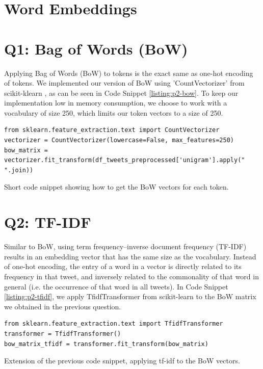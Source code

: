 \section*{\large Word Embeddings}


\section*{Q1: Bag of Words (BoW)}
Applying Bag of Words (BoW) \cite{bow} to tokens is the exact same as one-hot encoding of tokens.  We implemented our version of BoW using 'CountVectorizer' from scikit-klearn \cite{sklearn1, sklearn2}, as can be seen in Code Snippet \ref{listing:p2-bow}. To keep our implementation low in memory consumption, we choose to work with a vocabulary of size 250, which limits our token vectors to a size of 250.

\begin{listing*}
\begin{verbatim}
from sklearn.feature_extraction.text import CountVectorizer
vectorizer = CountVectorizer(lowercase=False, max_features=250)
bow_matrix = vectorizer.fit_transform(df_tweets_preprocessed['unigram'].apply(" ".join))
\end{verbatim}
\caption{Short code snippet showing how to get the BoW vectors for each token.}
\label{listing:p2-bow}
\end{listing*}


\section*{Q2: TF-IDF}
Similar to BoW, using term frequency–inverse document frequency (TF-IDF) \cite{tfidf} results in an embedding vector that has the same size as the vocabulary.  Instead of one-hot encoding, the entry of a word in a vector is directly related to its frequency in that tweet, and inversely related to the commonality of that word in general (i.e. the occurrence of that word in all tweets).  In Code Snippet \ref{listing:p2-tfidf}, we apply TfidfTransformer from scikit-learn \cite{sklearn1, sklearn2} to the BoW matrix we obtained in the previous question.

\begin{listing*}
\begin{verbatim}
from sklearn.feature_extraction.text import TfidfTransformer
transformer = TfidfTransformer()
bow_matrix_tfidf = transformer.fit_transform(bow_matrix)
\end{verbatim}
\caption{Extension of the previous code snippet, applying tf-idf to the BoW vectors.}
\label{listing:p2-tfidf}
\end{listing*}

